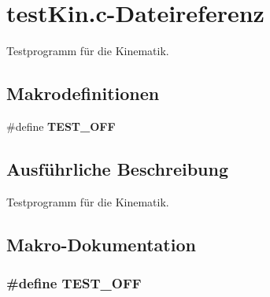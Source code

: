\section{testKin.c-\/Dateireferenz}
\label{test_kin_8c}


Testprogramm für die Kinematik.  


\subsection*{Makrodefinitionen}
\begin{DoxyCompactItemize}
\item 
\#define {\bf TEST\_\-OFF}
\end{DoxyCompactItemize}


\subsection{Ausführliche Beschreibung}
Testprogramm für die Kinematik. 

\subsection{Makro-\/Dokumentation}
\subsubsection[{TEST\_\-OFF}]{\setlength{\rightskip}{0pt plus 5cm}\#define TEST\_\-OFF}\label{test_kin_8c_a8f6764e8e57eabbb14922404c0e25175}
